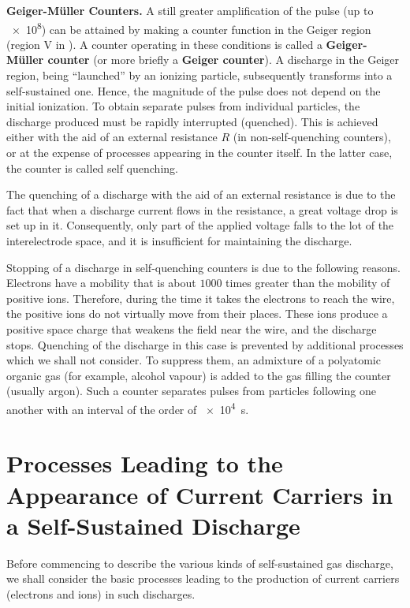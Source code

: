 \textbf{Geiger-M\"uller Counters.} A still greater amplification of the pulse (up to \num{e8}) can be attained by making a counter function in the Geiger region (region V in ).
A counter operating in these conditions is called a \textbf{Geiger-M\"uller counter} (or more briefly a \textbf{Geiger counter}).
A discharge in the Geiger region, being ``launched'' by an ionizing particle, subsequently transforms into a self-sustained one.
Hence, the magnitude of the pulse does not depend on the initial ionization.
To obtain separate pulses from individual particles, the discharge produced must be rapidly interrupted (quenched).
This is achieved either with the aid of an external resistance $R$ (in non-self-quenching counters), or at the expense of processes appearing in the counter itself.
In the latter case, the counter is called self quenching.

The quenching of a discharge with the aid of an external resistance is due to the fact that when a discharge current flows in the resistance, a great voltage drop is set up in it.
Consequently, only part of the applied voltage falls to the lot of the interelectrode space, and it is insufficient for maintaining the discharge.

Stopping of a discharge in self-quenching counters is due to the following reasons.
Electrons have a mobility that is about $1000$ times greater than the mobility of positive ions. Therefore, during the time it takes the electrons to reach the wire, the positive ions do not virtually move from their places.
These ions produce a positive space charge that weakens the field near the wire, and the discharge stops.
Quenching of the discharge in this case is prevented by additional processes which we shall not consider. To suppress them, an admixture of a polyatomic organic gas (for example, alcohol vapour) is added to the gas filling the counter (usually argon).
Such a counter separates pulses from particles following one another with an interval of the order of \SI{e4}{\second}.

\section[Processes Leading to the Appearance of Current Carriers]{Processes Leading to the Appearance of Current Carriers in a Self-Sustained Discharge}\label{sec:12_4}

Before commencing to describe the various kinds of self-sustained gas discharge, we shall consider the basic processes leading to the production of current carriers (electrons and ions) in such discharges.

